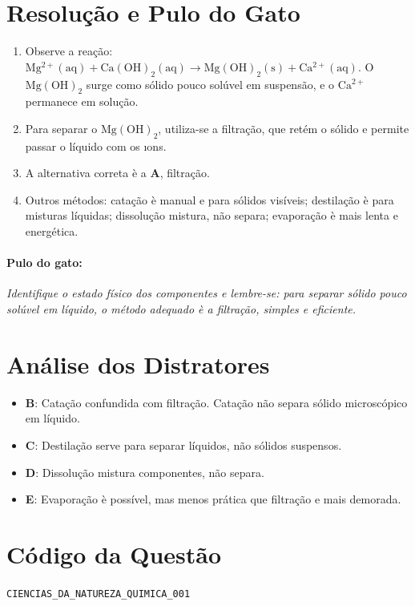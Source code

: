 \documentclass{article}
\begin{document}
\section*{Resolução e Pulo do Gato}
\begin{enumerate}
\item Observe a reação: $\mathrm{Mg^{2+} (aq) + Ca(OH)_2 (aq) \rightarrow Mg(OH)_2 (s) + Ca^{2+} (aq)}$. O $\mathrm{Mg(OH)_2}$ surge como sólido pouco solúvel em suspensão, e o $\mathrm{Ca^{2+}}$ permanece em solução.
\item Para separar o $\mathrm{Mg(OH)_2}$, utiliza-se a filtração, que retém o sólido e permite passar o líquido com os \i{ons}.
\item A alternativa correta \`e a \textbf{A}, filtração.
\item Outros métodos: catação \`e manual e para sólidos visíveis; destilação \`e para misturas líquidas; dissolução mistura, não separa; evaporação \`e mais lenta e energética.
\end{enumerate}

\paragraph{Pulo do gato:}
\textit{Identifique o estado físico dos componentes e lembre-se: para separar sólido pouco solúvel em líquido, o método adequado \`e a filtração, simples e eficiente.}

\section*{Análise dos Distratores}
\begin{itemize}
\item \textbf{B}: Catação confundida com filtração. Catação não separa sólido microscópico em líquido.
\item \textbf{C}: Destilação serve para separar líquidos, não sólidos suspensos.
\item \textbf{D}: Dissolução mistura componentes, não separa.
\item \textbf{E}: Evaporação \`e possível, mas menos prática que filtração e mais demorada.
\end{itemize}

\section*{Código da Questão}
\texttt{CIENCIAS_DA_NATUREZA_QUIMICA_001}
\end{document}
